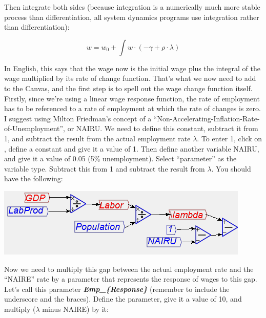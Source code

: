 Then integrate both sides (because integration is a numerically much
more stable process than differentiation, all system dynamics programs
use integration rather than differentiation):

\[
w=w_{0}+\int w\cdot(-\gamma+\rho\cdot\lambda)
\]

In English, this says that the wage now is the initial wage plus the
integral of the wage multiplied by its rate of change function. That's
what we now need to add to the Canvas, and the first step is to spell
out the wage change function itself. Firstly, since we're using a
linear wage response function, the rate of employment has to be referenced
to a rate of employment at which the rate of changes is zero. I suggest
using Milton Friedman's concept of a ``Non-Accelerating-Inflation-Rate-of-Unemployment'',
or NAIRU. We need to define this constant, subtract it from 1, and
subtract the result from the actual employment rate $\lambda$. To
enter 1, click on , define a constant and
give it a value of 1. Then define another variable NAIRU, and give
it a value of 0.05 (5\% unemployment). Select ``parameter'' as the
variable type. Subtract this from 1 and subtract the result from $\lambda$.
You should have the following:
\begin{center}
\includegraphics{images/NewItem108} 
\par\end{center}

Now we need to multiply this gap between the actual employment rate
and the ``NAIRE'' rate by a parameter that represents the response
of wages to this gap. Let's call this parameter \textbf{\em Emp\_\{Response\}}
(remember to include the underscore and the braces). Define the parameter,
give it a value of 10, and multiply ($\lambda$ minus NAIRE) by it:
\begin{center}
\par\end{center}

